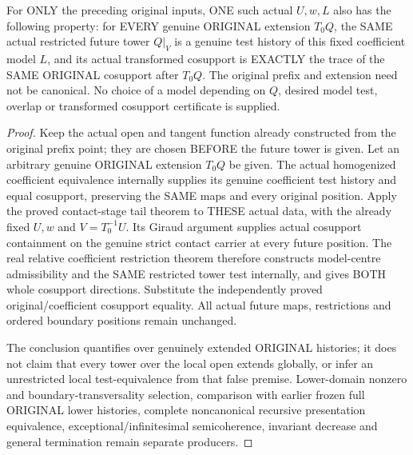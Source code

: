 \begin{theorem}
\label{hir:original-noncanonical-uniform-contact-test-presentation}
\leanok
For ONLY the preceding original inputs, ONE such actual $U,w,L$ also has
the following property: for EVERY genuine ORIGINAL extension $T_0Q$,
the SAME actual restricted future tower $Q|_V$ is a genuine test history
of this fixed coefficient model $L$, and its actual transformed cosupport
is EXACTLY the trace of the SAME ORIGINAL cosupport after $T_0Q$.
The original prefix and extension need not be canonical. No choice of a
model depending on $Q$, desired model test, overlap or transformed
cosupport certificate is supplied.
\end{theorem}
\begin{proof}
Keep the actual open and tangent function already constructed from the
original prefix point; they are chosen BEFORE the future tower is given.
Let an arbitrary genuine ORIGINAL extension $T_0Q$ be given. The actual
homogenized coefficient equivalence internally supplies its genuine
coefficient test history and equal cosupport, preserving the SAME maps
and every original position. Apply the proved contact-stage tail theorem
to THESE actual data, with the already fixed $U,w$ and $V=T_0^{-1}U$.
Its Giraud argument supplies actual cosupport containment on the genuine
strict contact carrier at every future position. The real relative
coefficient restriction theorem therefore constructs model-centre
admissibility and the SAME restricted tower test internally, and gives
BOTH whole cosupport directions. Substitute the independently proved
original/coefficient cosupport equality. All actual future maps,
restrictions and ordered boundary positions remain unchanged.

The conclusion quantifies over genuinely extended ORIGINAL histories;
it does not claim that every tower over the local open extends globally,
or infer an unrestricted local test-equivalence from that false premise.
Lower-domain nonzero and boundary-transversality selection, comparison
with earlier frozen full ORIGINAL lower histories, complete noncanonical
recursive presentation equivalence, exceptional/infinitesimal semicoherence,
invariant decrease and general termination remain separate producers.
\end{proof}
